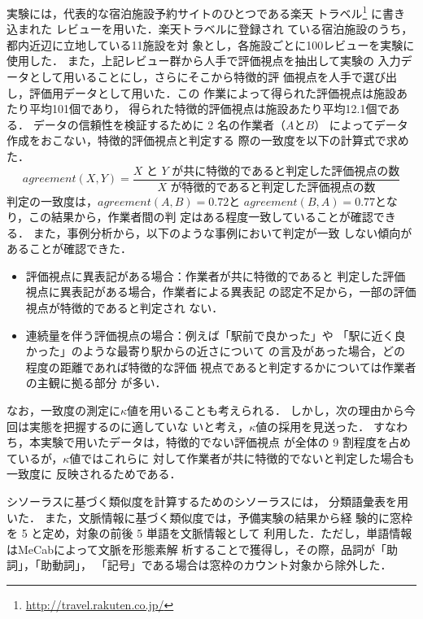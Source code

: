 \documentclass[japanese]{jnlp_1.4}
\begin{document}
実験には，代表的な宿泊施設予約サイトのひとつである楽天
トラベル\footnote{\url{http://travel.rakuten.co.jp/}}
に書き込まれた
\pagebreak
レビューを用いた．楽天トラベルに登録され
ている宿泊施設のうち，都内近辺に立地している11施設を対
象とし，各施設ごとに100レビューを実験に使用した．
また，上記レビュー群から人手で評価視点を抽出して実験の
入力データとして用いることにし，さらにそこから特徴的評
価視点を人手で選び出し，評価用データとして用いた．この
作業によって得られた評価視点は施設あたり平均101個であり，
得られた特徴的評価視点は施設あたり平均12.1個である．
データの信頼性を検証するために 2 名の作業者（$A$と$B$）
によってデータ作成をおこない，特徴的評価視点と判定する
際の一致度を以下の計算式で求めた．
\begin{equation}
 \mathit{agreement}(X,Y) = 
   \frac{\text{$X$ と $Y$ が共に特徴的であると判定した評価視点の数}}{\text{$X$ が特徴的であると判定した評価視点の数}}
\end{equation}
判定の一致度は，$\mathit{agreement}(A,B)=0.72$と
$\mathit{agreement}(B,A)=0.77$となり，この結果から，作業者間の判
定はある程度一致していることが確認できる．
また，事例分析から，以下のような事例において判定が一致
しない傾向があることが確認できた．
\begin{itemize}
\item 
評価視点に異表記がある場合：作業者が共に特徴的であると
判定した評価視点に異表記がある場合，作業者による異表記
の認定不足から，一部の評価視点が特徴的であると判定され
ない．
\item 
連続量を伴う評価視点の場合：例えば「駅前で良かった」や
「駅に近く良かった」のような最寄り駅からの近さについて
の言及があった場合，どの程度の距離であれば特徴的な評価
視点であると判定するかについては作業者の主観に拠る部分
が多い．
\end{itemize}
なお，一致度の測定に$\kappa$値を用いることも考えられる．
しかし，次の理由から今回は実態を把握するのに適していな
いと考え，$\kappa$値の採用を見送った．
すなわち，本実験で用いたデータは，特徴的でない評価視点
が全体の 9 割程度を占めているが，$\kappa$値ではこれらに
対して作業者が共に特徴的でないと判定した場合も一致度に
反映されるためである．

シソーラスに基づく類似度を計算するためのシソーラスには，
分類語彙表\cite{bunrui}を用いた．
また，文脈情報に基づく類似度では，予備実験の結果から経
験的に窓枠を 5 と定め，対象の前後 5 単語を文脈情報として
利用した．ただし，単語情報はMeCabによって文脈を形態素解
析することで獲得し，その際，品詞が「助詞」，「助動詞」，
「記号」である場合は窓枠のカウント対象から除外した．
\end{document}
